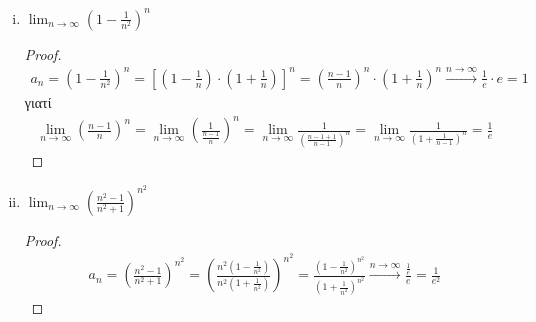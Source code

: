 \begin{enumerate}
\begin{enumerate}[i)]
            \item $ \lim_{n \to \infty} \left(1- \frac{1}{n^{2}}\right)^{n} $
                \begin{proof}
                    \begin{align*}
                        a_{n}=\left(1- \frac{1}{n^{2}} \right)^{n} = 
                        \left[\left(1- \frac{1}{n} \right) \cdot
                            \left(1+ \frac{1}{n} \right)\right]^{n} = \left(\frac{n-1}{n} 
                        \right)^{n} \cdot 
                        \left(1+ \frac{1}{n} \right)^{n} \xrightarrow{n \to \infty}  
                        \frac{1}{e} \cdot e = 1
                    \end{align*} 
                    γιατί 
                    \begin{align*}
                        \lim_{n \to \infty} \left(\frac{n-1}{n} \right)^{n} = 
                        \lim_{n \to \infty} \left(\frac{1}{\frac{n-1}{n}}\right)^{n} = 
                        \lim_{n \to \infty} \frac{1}{\left(\frac{n-1+1}{n-1}\right)^{n}} = 
                        \lim_{n \to \infty} \frac{1}{\left(1+ \frac{1}{n-1} \right)^{n}} =
                        \frac{1}{e} 
                    \end{align*}
                \end{proof}

            \item $ \lim_{n \to \infty} \left(\frac{n^{2}-1}{n^{2}+1} \right)^{n^{2}} $
                \begin{proof}
                    \begin{align*}
                        a_{n} = \left(\frac{n^{2}-1}{n^{2}+1}\right)^{n^{2}} = 
                        \left(\frac{n^{2}\left(1- 
                                    \frac{1}{n^{2}}\right)}{n^{2}\left(1+ 
                        \frac{1}{n^{2}}\right)}\right)^{n^{2}} = 
                        \frac{\left(1 - \frac{1}{n^{2}}\right)^{n^{2}}}
                        {\left(1 + \frac{1}{n^{2}} \right)^{n^{2}}} 
                        \xrightarrow{n \to \infty}  
                        \frac{\frac{1}{e}}{e} = \frac{1}{e^{2}} 
                    \end{align*} 
                \end{proof}
        \end{enumerate}


\end{enumerate}

